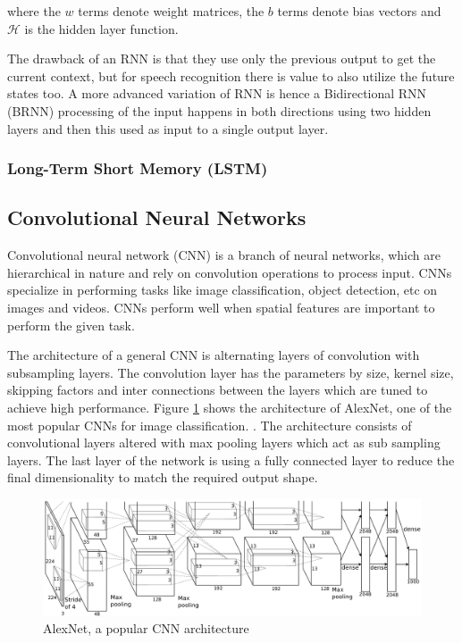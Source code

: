 where the $w$ terms denote weight matrices, the $b$ terms denote bias vectors and $\mathcal{H}$ is the hidden layer function. \cite{Graves2013SpeechNetworks}

The drawback of an RNN is that they use only the previous output to get the current context, but for speech recognition there is value to also utilize the future states too. A more advanced variation of RNN is hence a Bidirectional RNN (BRNN) \cite{Schuster1997BidirectionalNetworks} processing of the input happens in both directions using two hidden layers and then this used as input to a single output layer. 

\subsubsection{Long-Term Short Memory (LSTM)}

\subsection {Convolutional Neural Networks}
Convolutional neural network (CNN) is a branch of neural networks, which are hierarchical in nature and rely on convolution operations to process input. CNNs specialize in performing tasks like image classification, object detection, etc on images and videos. CNNs perform well when spatial features are important to perform the given task. \cite{KrizhevskyImageNetNetworks}

The architecture of a general CNN is alternating layers of convolution with subsampling layers. \cite{CiresanFlexibleClassification} The convolution layer has the parameters by size, kernel size, skipping factors and inter connections between the layers which are tuned to achieve high performance. Figure \ref{fig:cnn} shows the architecture of AlexNet, one of the most popular CNNs for image classification. \cite{KrizhevskyImageNetNetworks}. The architecture consists of convolutional layers altered with max pooling layers which act as sub sampling layers. The last layer of the network is using a fully connected layer to reduce the final dimensionality to match the required output shape.
\begin{figure}[ht]
  \begin{center}
    \includegraphics[width=\textwidth]{images/cnn.png} 
    \caption{AlexNet, a popular CNN architecture  \cite{KrizhevskyImageNetNetworks}}
    \label{fig:cnn}
  \end{center}
\end{figure}

